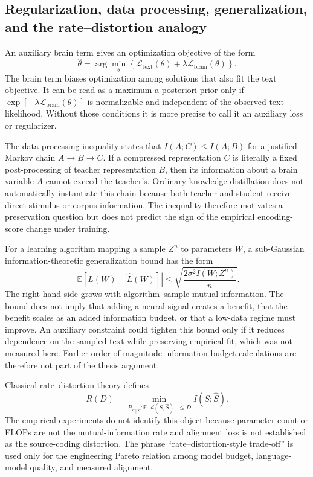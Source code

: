 \subsection{Regularization, data processing, generalization, and the rate--distortion analogy}

An auxiliary brain term gives an optimization objective of the form
\begin{equation}
\widehat\theta=\arg\min_\theta\left\{\mathcal L_{\mathrm{text}}(\theta)+\lambda\mathcal L_{\mathrm{brain}}(\theta)\right\}.
\end{equation}
The brain term biases optimization among solutions that also fit the text objective.
It can be read as a maximum-a-posteriori prior only if $\exp[-\lambda\mathcal L_{\mathrm{brain}}(\theta)]$ is normalizable and independent of the observed text likelihood.
Without those conditions it is more precise to call it an auxiliary loss or regularizer.

The data-processing inequality states that $I(A;C)\le I(A;B)$ for a justified Markov chain $A\rightarrow B\rightarrow C$.
If a compressed representation $C$ is literally a fixed post-processing of teacher representation $B$, then its information about a brain variable $A$ cannot exceed the teacher's.
Ordinary knowledge distillation does not automatically instantiate this chain because both teacher and student receive direct stimulus or corpus information.
The inequality therefore motivates a preservation question but does not predict the sign of the empirical encoding-score change under training.

For a learning algorithm mapping a sample $Z^n$ to parameters $W$, a sub-Gaussian information-theoretic generalization bound has the form
\begin{equation}
\left|\mathbb E[L(W)-\widehat L(W)]\right|\le \sqrt{\frac{2\sigma^2 I(W;Z^n)}{n}}.
\end{equation}
The right-hand side grows with algorithm--sample mutual information.
The bound does not imply that adding a neural signal creates a benefit, that the benefit scales as an added information budget, or that a low-data regime must improve.
An auxiliary constraint could tighten this bound only if it reduces dependence on the sampled text while preserving empirical fit, which was not measured here.
Earlier order-of-magnitude information-budget calculations are therefore not part of the thesis argument.

Classical rate--distortion theory defines
\begin{equation}
R(D)=\min_{P_{\widehat S\mid S}:\mathbb E[d(S,\widehat S)]\le D}I(S;\widehat S).
\end{equation}
The empirical experiments do not identify this object because parameter count or FLOPs are not the mutual-information rate and alignment loss is not established as the source-coding distortion.
The phrase ``rate--distortion-style trade-off'' is used only for the engineering Pareto relation among model budget, language-model quality, and measured alignment.

